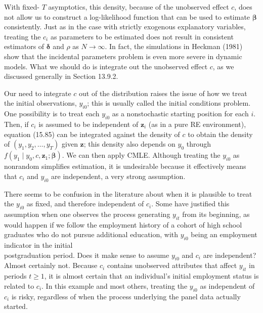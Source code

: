 \documentclass[10pt]{article}
\begin{document}
With fixed- $T$ asymptotics, this density, because of the unobserved effect $c$, does not allow us to construct a log-likelihood function that can be used to estimate $\boldsymbol{\beta}$ consistently. Just as in the case with strictly exogenous explanatory variables, treating the $c_{i}$ as parameters to be estimated does not result in consistent estimators of $\boldsymbol{\delta}$ and $\rho$ as $N \rightarrow \infty$. In fact, the simulations in Heckman (1981) show that the incidental parameters problem is even more severe in dynamic models. What we should do is integrate out the unobserved effect $c$, as we discussed generally in Section 13.9.2.

Our need to integrate $c$ out of the distribution raises the issue of how we treat the initial observations, $y_{i 0}$; this is usually called the initial conditions problem. One possibility is to treat each $y_{i 0}$ as a nonstochastic starting position for each $i$. Then, if $c_{i}$ is assumed to be independent of $\mathbf{z}_{i}$ (as in a pure RE environment), equation (15.85) can be integrated against the density of $c$ to obtain the density of $\left(y_{1}, y_{2}, \ldots, y_{T}\right)$ given $\mathbf{z}$; this density also depends on $y_{0}$ through $f\left(y_{1} \mid y_{0}, c, \mathbf{z}_{1} ; \boldsymbol{\beta}\right)$. We can then apply CMLE. Although treating the $y_{i 0}$ as nonrandom simplifies estimation, it is undesirable because it effectively means that $c_{i}$ and $y_{i 0}$ are independent, a very strong assumption.

There seems to be confusion in the literature about when it is plausible to treat the $y_{i 0}$ as fixed, and therefore independent of $c_{i}$. Some have justified this assumption when one observes the process generating $y_{i t}$ from its beginning, as would happen if we follow the employment history of a cohort of high school graduates who do not pursue additional education, with $y_{i 0}$ being an employment indicator in the initial\\
postgraduation period. Does it make sense to assume $y_{i 0}$ and $c_{i}$ are independent? Almost certainly not. Because $c_{i}$ contains unobserved attributes that affect $y_{i t}$ in periods $t \geq 1$, it is almost certain that an individual's initial employment status is related to $c_{i}$. In this example and most others, treating the $y_{i 0}$ as independent of $c_{i}$ is risky, regardless of when the process underlying the panel data actually started.
\end{document}
